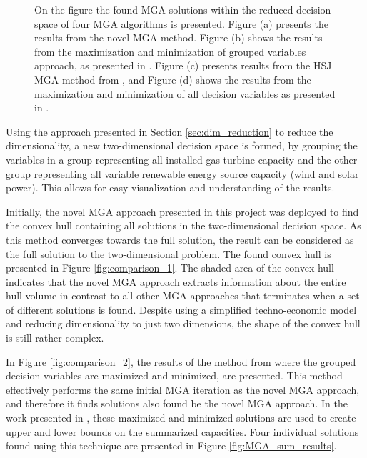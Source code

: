 \begin{figure}[h]
\begin{subfigure}{.5\textwidth}
		\caption{}
		\label{fig:comparison_4}
	\end{subfigure}
	\caption{On the figure the found MGA solutions within the reduced decision space of four MGA algorithms is presented. Figure (a) presents the results from the novel MGA method. Figure (b) shows the results from the maximization and minimization of grouped variables approach, as presented in \cite{Fabian_MGA}. Figure (c) presents results from the HSJ MGA method from \cite{DeCarolis_MGA}, and Figure (d) shows the results from the maximization and minimization of all decision variables as presented in \cite{Fabian_MGA}.}
	\label{fig:comparison_results}
\end{figure}

Using the approach presented in Section \ref{sec:dim_reduction} to reduce the dimensionality, a new two-dimensional decision space is formed, by grouping the variables in a group representing all installed gas turbine capacity and the other group representing all variable renewable energy source capacity (wind and solar power). This allows for easy visualization and understanding of the results. 

Initially, the novel MGA approach presented in this project was deployed to find the convex hull containing all solutions in the two-dimensional decision space. As this method converges towards the full solution, the result can be considered as the full solution to the two-dimensional problem. The found convex hull is presented in Figure \ref{fig:comparison_1}. The shaded area of the convex hull indicates that the novel MGA approach extracts information about the entire hull volume in contrast to all other MGA approaches that terminates when a set of different solutions is found. Despite using a simplified techno-economic model and reducing dimensionality to just two dimensions, the shape of the convex hull is still rather complex. 





In Figure \ref{fig:comparison_2}, the results of the method from \cite{Fabian_MGA} where the grouped decision variables are maximized and minimized, are presented. This method effectively performs the same initial MGA iteration as the novel MGA approach, and therefore it finds solutions also found be the novel MGA approach. In the work presented in \cite{Fabian_MGA}, these maximized and minimized solutions are used to create upper and lower bounds on the summarized capacities. Four individual solutions found using this technique are presented in Figure \ref{fig:MGA_sum_results}. 



